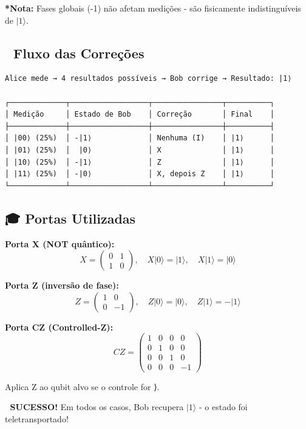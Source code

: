 \documentclass[
  brazilian,
]{report}
\begin{document}
\textbf{*Nota:} Fases globais (-1) não afetam medições - são fisicamente
indistinguíveis de \(|1\rangle\).

\subsection{🔄 Fluxo das Correções}\label{fluxo-das-correuxe7uxf5es}

\begin{verbatim}
Alice mede → 4 resultados possíveis → Bob corrige → Resultado: |1⟩

┌─────────────┬──────────────────┬────────────────┬──────────┐
│ Medição     │ Estado de Bob    │ Correção       │ Final    │
├─────────────┼──────────────────┼────────────────┼──────────┤
│ |00⟩ (25%)  │ -|1⟩             │ Nenhuma (I)    │ |1⟩      │
│ |01⟩ (25%)  │  |0⟩             │ X              │ |1⟩      │
│ |10⟩ (25%)  │ -|1⟩             │ Z              │ |1⟩      │
│ |11⟩ (25%)  │ -|0⟩             │ X, depois Z    │ |1⟩      │
└─────────────┴──────────────────┴────────────────┴──────────┘
\end{verbatim}

\subsection{🎓 Portas Utilizadas}\label{portas-utilizadas}

\textbf{Porta X (NOT quântico):}
\[X = \begin{pmatrix} 0 & 1 \\ 1 & 0 \end{pmatrix}, \quad X|0\rangle = |1\rangle, \quad X|1\rangle = |0\rangle\]

\textbf{Porta Z (inversão de fase):}
\[Z = \begin{pmatrix} 1 & 0 \\ 0 & -1 \end{pmatrix}, \quad Z|0\rangle = |0\rangle, \quad Z|1\rangle = -|1\rangle\]

\textbf{Porta CZ (Controlled-Z):}
\[CZ = \begin{pmatrix} 1 & 0 & 0 & 0 \\ 0 & 1 & 0 & 0 \\ 0 & 0 & 1 & 0 \\ 0 & 0 & 0 & -1 \end{pmatrix}\]

Aplica Z ao qubit alvo se o controle for ⟩.

🎉 \textbf{SUCESSO!} Em todos os casos, Bob recupera \(|1\rangle\) - o
estado foi teletransportado!
\end{document}
